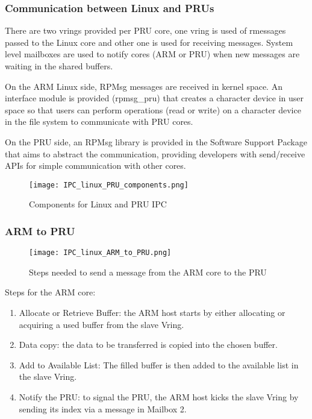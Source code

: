\subsubsection{Communication between Linux and PRUs}

There are two vrings provided per PRU core, one vring is used of rmessages
passed to the Linux core and other one is used for receiving messages.
System level mailboxes are used to notify cores (ARM or PRU) when new messages
are waiting in the shared buffers.

On the ARM Linux side, RPMsg messages are received in kernel space.
An interface module is provided (rpmsg\_pru) that creates a character device in
user space so that users can perform operations (read or write) on a character
device in the file system to communicate with PRU cores.

On the PRU side, an RPMsg library is provided in the Software Support Package
that aims to abstract the communication, providing developers with send/receive
APIs for simple communication with other cores.

\begin{figure}[ht]
    \centering
    \texttt{[image: IPC\_linux\_PRU\_components.png]}
    \caption{Components for Linux and PRU IPC}
\end{figure}

\subsubsection{ARM to PRU}

\begin{figure}[ht]
    \centering
    \texttt{[image: IPC\_linux\_ARM\_to\_PRU.png]}
    \caption{Steps needed to send a message from the ARM core to the PRU}
\end{figure}

Steps for the ARM core:

\begin{enumerate}
    \item   Allocate or Retrieve Buffer: the ARM host starts by either
            allocating or acquiring a used buffer from the slave Vring.
    \item   Data copy: the data to be transferred is copied into the chosen
            buffer.
    \item   Add to Available List: The filled buffer is then added to the
            available list in the slave Vring.
    \item   Notify the PRU: to signal the PRU, the ARM host kicks the slave
            Vring by sending its index via a message in Mailbox 2.
\end{enumerate}

